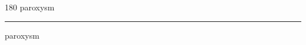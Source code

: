 
\begin{frame}
\begin{center}
\begin{turn}{180}
{\fontsize{2.5cm}{1em}\selectfont paroxysm}
\end{turn}
\vspace{1em}\par  
\hrule
\vspace{1em}\par  
{\fontsize{2.5cm}{1em}\selectfont paroxysm}
\end{center}
\end{frame}
